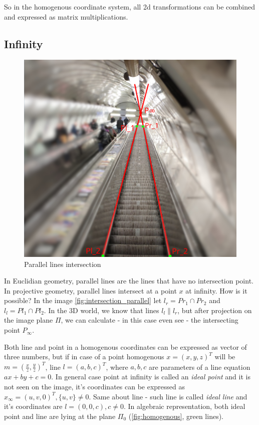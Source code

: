 So in the homogenous coordinate system, all 2d transformations can be combined and expressed as matrix multiplications.

\subsection{Infinity}
\begin{figure}[h]
    \centering
    \includegraphics[width=1\textwidth]{graphics/parallel_intersection.jpg}
    \caption{Parallel lines intersection}
    \label{fig:intersection_parallel}
\end{figure}

In Euclidian geometry, parallel lines are the lines that have no intersection point. 
In projective geometry, parallel lines intersect at a point $x$ at infinity. 
How is it possible? 
In the image \autoref{fig:intersection_parallel} let $l_r = Pr_1 \cap Pr_2 $ and $l_l = Pl_1 \cap Pl_2$. 
In the 3D world, we know that lines $l_l \parallel l_r$, but after projection on the image plane $\Pi$, we can calculate - in this case even see - the intersecting point $P_{\infty}$. 

Both line and point in a homogenous coordinates can be expressed as vector of three numbers, but if in case of a point homogenous $x = (x, y, z)^T$ will be $m = (\frac{x}{z}, \frac{y}{z})^T$, line $l = (a, b, c)^T$, where $a, b, c$ are parameters of a line equation $ax + by + c = 0$. 
In general case point at infinity is called an \textit{ideal point} and it is not seen on the image, it's coordinates can be expressed as $x_{\infty} = (u, v, 0)^T, \{u, v\} \neq 0$. Same about line - such line is called \textit{ideal line} and it's coordinates are $l = (0, 0, c), c \neq 0$. In algebraic representation, both ideal point and line are lying at the plane $\Pi_0$ (\autoref{fig:homogenous}, green lines).

